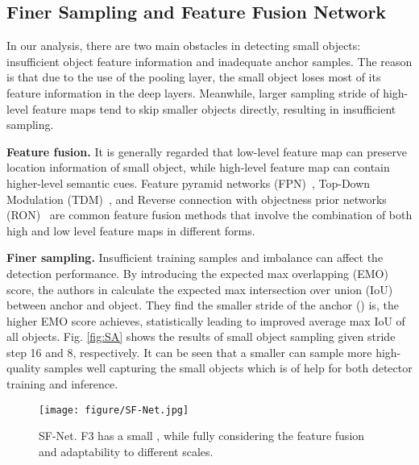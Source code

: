 \documentclass[10pt,twocolumn,letterpaper]{article}
\begin{document}
	\subsection{Finer Sampling and Feature Fusion Network}\label{subsec:sfn}
In our analysis, there are two main obstacles in detecting small objects: insufficient object feature information and inadequate anchor samples. The reason is that due to the use of the pooling layer, the small object loses most of its feature information in the deep layers. Meanwhile, larger sampling stride of high-level feature maps tend to skip smaller objects directly, resulting in insufficient sampling.
	
	{\bf Feature fusion.} It is generally regarded that low-level feature map can preserve location information of small object, while high-level feature map can contain higher-level semantic cues. Feature pyramid networks (FPN)~\cite{lin2017feature}, Top-Down Modulation (TDM)~\cite{shrivastava2016beyond}, and Reverse connection with objectness prior networks (RON)~\cite{kong2017ron} are common feature fusion methods that involve the combination of both high and low level feature maps in different forms. 

	{\bf Finer sampling.} Insufficient training samples and imbalance can affect the detection performance. By introducing the expected max overlapping (EMO) score, the authors in \cite{zhu2018seeing} calculate the expected max intersection over union (IoU) between anchor and object. They find the smaller stride of the anchor () is, the higher EMO score achieves, statistically leading to improved average max IoU of all objects. Fig. \ref{fig:SA} shows the results of small object sampling given stride step 16 and 8, respectively. It can be seen that a smaller  can sample more high-quality samples well capturing the small objects which is of help for both detector training and inference.
	
	\begin{figure}[!tb]
		\begin{center}
			\texttt{[image: figure/SF-Net.jpg]}
		\end{center}
		\vspace{-20pt}
		\caption{SF-Net. F3 has a small , while fully considering the feature fusion and adaptability to different scales.}
		\label{fig:SF-Net}
	\end{figure}
	
\end{document}
